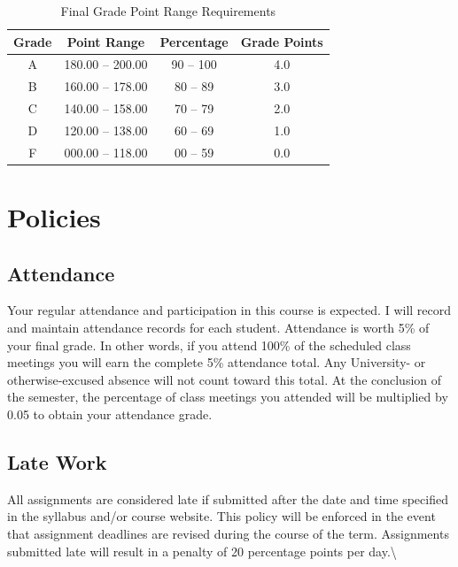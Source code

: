 \documentclass[
]{article}
\begin{document}
\begin{table}[H]
\begin{center}
\caption{Final Grade Point Range Requirements}
\label{finalgrades}
\vspace{3mm}
\begin{tabular}{cccc}
\hline
\bf{Grade} & \bf{Point Range} & \bf{Percentage} & \bf{Grade Points}\\
\hline
A & 180.00 -- 200.00 & 90 -- 100 & 4.0\\ 
B & 160.00 -- 178.00 & 80 -- 89  & 3.0\\ 
C & 140.00 -- 158.00 & 70 -- 79  & 2.0\\ 
D & 120.00 -- 138.00 & 60 -- 69  & 1.0\\ 
F & 000.00 -- 118.00 & 00 -- 59  & 0.0\\
\hline
\end{tabular}
\end{center}
\end{table}

\section{Policies}

\subsection{Attendance}

Your regular attendance and participation in this course is expected. I
will record and maintain attendance records for each student. Attendance
is worth 5\% of your final grade. In other words, if you attend 100\% of
the scheduled class meetings you will earn the complete 5\% attendance
total. Any University- or otherwise-excused absence will not count
toward this total. At the conclusion of the semester, the percentage of
class meetings you attended will be multiplied by 0.05 to obtain your
attendance grade.

\subsection{Late Work}

All assignments are considered late if submitted after the date and time
specified in the syllabus and/or course website. This policy will be
enforced in the event that assignment deadlines are revised during the
course of the term. Assignments submitted late will result in a penalty
of 20 percentage points per day.\textbackslash{}
\end{document}
